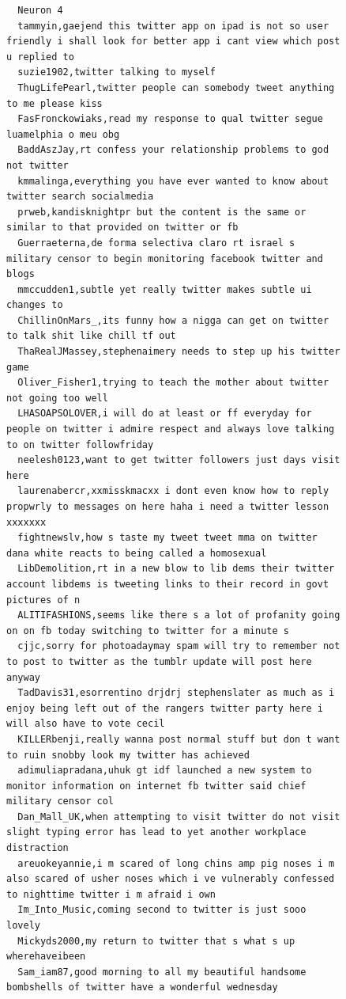 \begin{figure}[htpb]
\begin{verbatim}
  Neuron 4
  tammyin,gaejend this twitter app on ipad is not so user friendly i shall look for better app i cant view which post u replied to
  suzie1902,twitter talking to myself
  ThugLifePearl,twitter people can somebody tweet anything to me please kiss
  FasFronckowiaks,read my response to qual twitter segue luamelphia o meu obg
  BaddAszJay,rt confess your relationship problems to god not twitter
  kmmalinga,everything you have ever wanted to know about twitter search socialmedia
  prweb,kandisknightpr but the content is the same or similar to that provided on twitter or fb
  Guerraeterna,de forma selectiva claro rt israel s military censor to begin monitoring facebook twitter and blogs
  mmccudden1,subtle yet really twitter makes subtle ui changes to
  ChillinOnMars_,its funny how a nigga can get on twitter to talk shit like chill tf out
  ThaRealJMassey,stephenaimery needs to step up his twitter game
  Oliver_Fisher1,trying to teach the mother about twitter not going too well
  LHASOAPSOLOVER,i will do at least or ff everyday for people on twitter i admire respect and always love talking to on twitter followfriday
  neelesh0123,want to get twitter followers just days visit here
  laurenabercr,xxmisskmacxx i dont even know how to reply propwrly to messages on here haha i need a twitter lesson xxxxxxx
  fightnewslv,how s taste my tweet tweet mma on twitter dana white reacts to being called a homosexual
  LibDemolition,rt in a new blow to lib dems their twitter account libdems is tweeting links to their record in govt pictures of n
  ALITIFASHIONS,seems like there s a lot of profanity going on on fb today switching to twitter for a minute s
  cjjc,sorry for photoadaymay spam will try to remember not to post to twitter as the tumblr update will post here anyway
  TadDavis31,esorrentino drjdrj stephenslater as much as i enjoy being left out of the rangers twitter party here i will also have to vote cecil
  KILLERbenji,really wanna post normal stuff but don t want to ruin snobby look my twitter has achieved
  adimuliapradana,uhuk gt idf launched a new system to monitor information on internet fb twitter said chief military censor col
  Dan_Mall_UK,when attempting to visit twitter do not visit slight typing error has lead to yet another workplace distraction
  areuokeyannie,i m scared of long chins amp pig noses i m also scared of usher noses which i ve vulnerably confessed to nighttime twitter i m afraid i own
  Im_Into_Music,coming second to twitter is just sooo lovely
  Mickyds2000,my return to twitter that s what s up wherehaveibeen
  Sam_iam87,good morning to all my beautiful handsome bombshells of twitter have a wonderful wednesday

\end{verbatim}
\end{figure}
